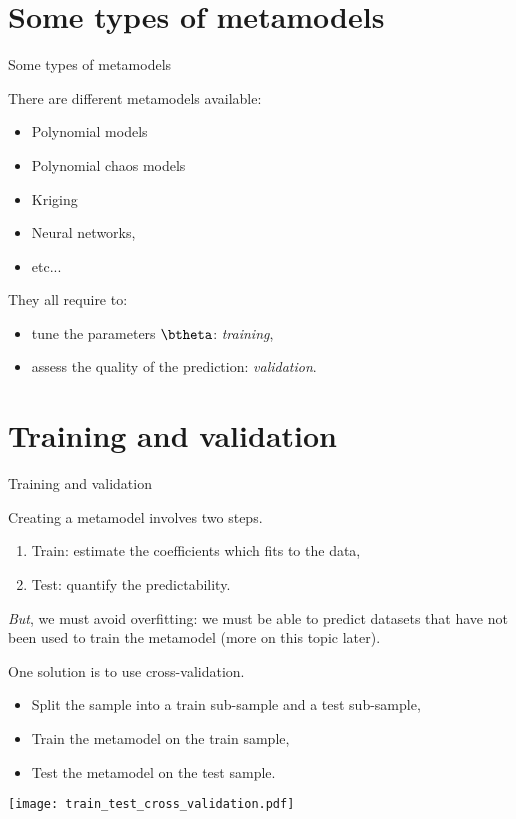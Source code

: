 \documentclass{beamer}
\begin{document}

\section{Some types of metamodels}
\begin{frame}[t]{Some types of metamodels}

There are different metamodels available:
\begin{itemize}
\item Polynomial models 
\item Polynomial chaos models 
\item Kriging
\item Neural networks, 
\item etc...
\end{itemize}

They all require to:
\begin{itemize}
\item tune the parameters $\btheta$: \emph{training}, 
\item assess the quality of the prediction: \emph{validation}.
\end{itemize}

\end{frame}


\section{Training and validation}
\begin{frame}[t]{Training and validation}

Creating a metamodel involves two steps.
\begin{enumerate}
\item Train: estimate the coefficients which fits to the data,
\item Test: quantify the predictability.
\end{enumerate}

\emph{But}, we must avoid overfitting: we must be able 
to predict datasets that have not been used to train the metamodel 
(more on this topic later).

One solution is to use cross-validation.
\begin{itemize}
\item Split the sample into a train sub-sample and a test sub-sample,
\item Train the metamodel on the train sample,
\item Test the metamodel on the test sample.
\end{itemize}

\begin{center}
 \texttt{[image: train\_test\_cross\_validation.pdf]}
\end{center}

\end{frame}
\end{document}
